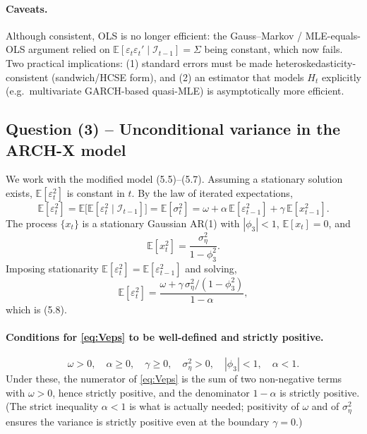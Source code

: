 \documentclass[12pt]{article}
\newcommand{\E}{\mathbb{E}}
\newcommand{\Info}{\mathcal{I}}
\begin{document}
\paragraph{Caveats.} Although consistent, OLS is no longer efficient: the Gauss--Markov / MLE-equals-OLS argument relied on $\E[\varepsilon_t\varepsilon_t'\mid\Info_{t-1}]=\Sigma$ being constant, which now fails. Two practical implications: (1) standard errors must be made heteroskedasticity-consistent (sandwich/HCSE form), and (2) an estimator that models $H_t$ explicitly (e.g.\ multivariate GARCH-based quasi-MLE) is asymptotically more efficient.

\subsection*{Question (3) -- Unconditional variance in the ARCH-X model}\label{sec:p3-q3}

We work with the modified model (5.5)--(5.7). Assuming a stationary solution exists, $\E[\varepsilon_t^2]$ is constant in $t$. By the law of iterated expectations,
\begin{equation*}
\E[\varepsilon_t^2]
= \E\!\big[\E[\varepsilon_t^2\mid\Info_{t-1}]\big]
= \E[\sigma_t^2]
= \omega + \alpha\,\E[\varepsilon_{t-1}^2] + \gamma\,\E[x_{t-1}^2].
\end{equation*}
The process $\{x_t\}$ is a stationary Gaussian AR(1) with $|\phi_3|<1$, $\E[x_t]=0$, and
\begin{equation}
\E[x_t^2] = \frac{\sigma_\eta^2}{1-\phi_3^2}.\label{eq:Vx}
\end{equation}
Imposing stationarity $\E[\varepsilon_t^2]=\E[\varepsilon_{t-1}^2]$ and solving,
\begin{equation}
\E[\varepsilon_t^2] = \frac{\omega+\gamma\,\sigma_\eta^2/(1-\phi_3^2)}{1-\alpha},\label{eq:Veps}
\end{equation}
which is (5.8).

\paragraph{Conditions for \eqref{eq:Veps} to be well-defined and strictly positive.}
\begin{equation*}
\omega>0,\quad \alpha\geq 0,\quad \gamma\geq 0,\quad \sigma_\eta^2>0,\quad |\phi_3|<1,\quad \alpha<1.
\end{equation*}
Under these, the numerator of \eqref{eq:Veps} is the sum of two non-negative terms with $\omega>0$, hence strictly positive, and the denominator $1-\alpha$ is strictly positive. (The strict inequality $\alpha<1$ is what is actually needed; positivity of $\omega$ and of $\sigma_\eta^2$ ensures the variance is strictly positive even at the boundary $\gamma=0$.)
\end{document}
